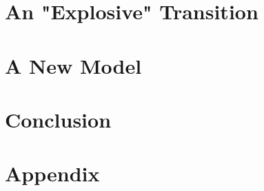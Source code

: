 \documentclass[12pt,twoside]{report}
\begin{document}
\chapter{An "Explosive" Transition}
\label{ch:explosive}


\chapter{A New Model}
\label{ch:sea}


\chapter{Conclusion}
\label{ch:conclusion}


\appendix
\chapter{Appendix}
\label{ch:appendix}


\printbibliography
\end{document}
